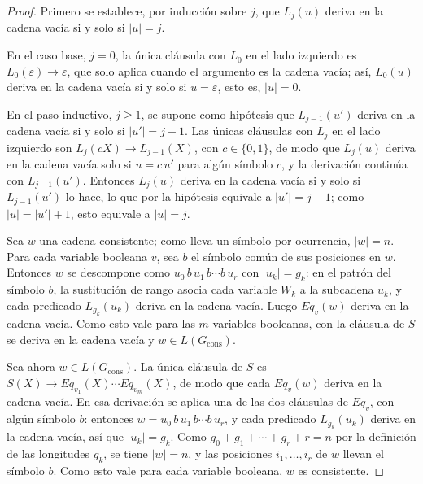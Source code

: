 \begin{proof}
Primero se establece, por inducción sobre $j$, que $L_j(u)$ deriva en
la cadena vacía si y solo si $|u| = j$.

En el caso base, $j = 0$, la única cláusula con $L_0$ en el lado
izquierdo es $L_0(\varepsilon) \to \varepsilon$, que solo aplica cuando
el argumento es la cadena vacía; así, $L_0(u)$ deriva en la cadena
vacía si y solo si $u = \varepsilon$, esto es, $|u| = 0$.

En el paso inductivo, $j \ge 1$, se supone como hipótesis que
$L_{j-1}(u')$ deriva en la cadena vacía si y solo si $|u'| = j-1$. Las
únicas cláusulas con $L_j$ en el lado izquierdo son
$L_j(cX) \to L_{j-1}(X)$, con $c \in \{0,1\}$, de modo que $L_j(u)$
deriva en la cadena vacía solo si $u = c\,u'$ para algún símbolo $c$, y
la derivación continúa con $L_{j-1}(u')$. Entonces $L_j(u)$ deriva en
la cadena vacía si y solo si $L_{j-1}(u')$ lo hace, lo que por la
hipótesis equivale a $|u'| = j-1$; como $|u| = |u'| + 1$, esto equivale
a $|u| = j$.

Sea $w$ una cadena consistente; como lleva un símbolo por ocurrencia,
$|w| = n$. Para cada variable booleana $v$, sea $b$ el símbolo común
de sus posiciones en $w$. Entonces $w$ se descompone como
$u_0\, b\, u_1\, b \cdots b\, u_r$ con $|u_k| = g_k$: en el patrón
del símbolo $b$, la sustitución de rango asocia cada variable $W_k$ a
la subcadena $u_k$, y cada predicado $L_{g_k}(u_k)$ deriva en la
cadena vacía. Luego $Eq_v(w)$ deriva en la cadena vacía. Como esto
vale para las $m$ variables booleanas, con la cláusula de $S$ se
deriva en la cadena vacía y $w \in L(G_{\mathrm{cons}})$.

Sea ahora $w \in L(G_{\mathrm{cons}})$. La única cláusula de $S$ es
$S(X) \to Eq_{v_1}(X) \cdots Eq_{v_m}(X)$, de modo que cada $Eq_v(w)$
deriva en la cadena vacía. En esa derivación se aplica una de las dos
cláusulas de $Eq_v$, con algún símbolo $b$: entonces
$w = u_0\, b\, u_1\, b \cdots b\, u_r$, y cada predicado
$L_{g_k}(u_k)$ deriva en la cadena vacía, así que $|u_k| = g_k$. Como
$g_0 + g_1 + \cdots + g_r + r = n$ por la definición de las
longitudes $g_k$, se tiene $|w| = n$, y las posiciones
$i_1, \ldots, i_r$ de $w$ llevan el símbolo $b$. Como esto vale para
cada variable booleana, $w$ es consistente.
\end{proof}

